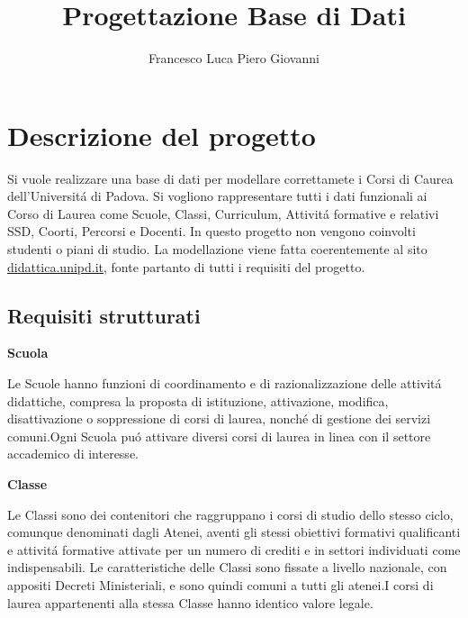 \documentclass[a4paper,12pt,italian,towside]{article}
\title{Progettazione Base di Dati}
\author{Francesco Luca Piero Giovanni}
\date{}
\begin{document}
\maketitle
\newpage

\tableofcontents

\newpage
\section{Descrizione del progetto}
Si vuole realizzare una base di dati per modellare correttamete i Corsi di Caurea dell'Universit\'a di Padova.
Si vogliono rappresentare tutti i dati funzionali ai Corso di Laurea come Scuole, Classi, Curriculum, Attivit\'a formative e relativi SSD, Coorti, Percorsi e Docenti.
In questo progetto non vengono coinvolti studenti o piani di studio.
\newline
La modellazione viene fatta coerentemente al sito  \href{https://didattica.unipd.it/}{didattica.unipd.it}, fonte partanto di tutti i requisiti del progetto.



\subsection{Requisiti strutturati}

\textbf{Scuola}
\par Le Scuole hanno funzioni di coordinamento e di razionalizzazione delle attivit\'a didattiche, compresa la proposta di istituzione, attivazione, modifica, disattivazione o soppressione di corsi di laurea, nonch\'e di gestione dei servizi comuni.\textcolor{red!50}{Ogni Scuola pu\'o attivare diversi corsi di laurea in linea con il settore accademico di interesse.}
\newline

\textbf{Classe}
\par
\textcolor{red!50}{Le Classi sono dei contenitori che raggruppano i corsi di studio dello stesso ciclo, comunque denominati dagli Atenei, aventi gli stessi obiettivi formativi qualificanti e attivit\'a formative attivate per un numero di crediti e in settori individuati come indispensabili. Le caratteristiche delle Classi sono fissate a livello nazionale, con appositi Decreti Ministeriali, e sono quindi comuni a tutti gli atenei.I corsi di laurea appartenenti alla stessa Classe hanno identico valore legale.}
\\
\end{document}
